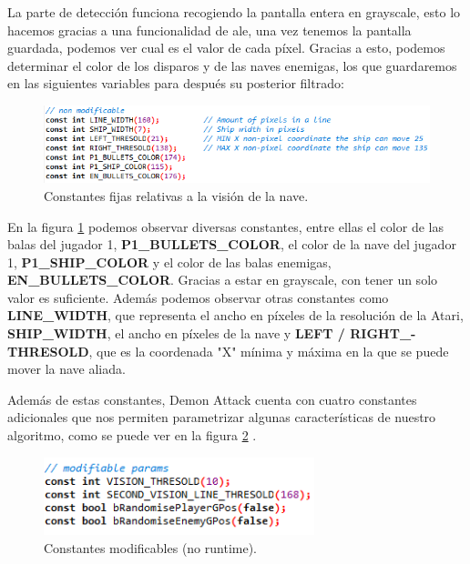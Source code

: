 La parte de detección funciona recogiendo la pantalla entera en grayscale, esto lo hacemos gracias a una funcionalidad de \ac{ale}, una vez tenemos la pantalla guardada, podemos ver cual es el valor de cada píxel. Gracias a esto, podemos determinar el color de los disparos y de las naves enemigas, los que guardaremos en las siguientes variables para después su posterior filtrado:

\begin{figure}[h]
	\centering
	\includegraphics[width=1\textwidth]{Figures/demonAttackStaticOne}
	\caption{Constantes fijas relativas a la visión de la nave.}
	\label{fig:demonAttackStaticOne}
\end{figure}

En la figura \ref{fig:demonAttackStaticOne} podemos observar diversas constantes, entre ellas el color de las balas del jugador 1, \textbf{P1\_BULLETS\_COLOR}, el color de la nave del jugador 1, \textbf{P1\_SHIP\_COLOR} y el color de las balas enemigas, \textbf{EN\_BULLETS\_COLOR}. Gracias a estar en grayscale, con tener un solo valor es suficiente. Además podemos observar otras constantes como \textbf{LINE\_WIDTH}, que representa el ancho en píxeles de la resolución de la Atari, \textbf{SHIP\_WIDTH}, el ancho en píxeles de la nave y \textbf{LEFT / RIGHT\_-THRESOLD}, que es la coordenada "X" mínima y máxima en la que se puede mover la nave aliada.

Además de estas constantes, Demon Attack cuenta con cuatro constantes adicionales que nos permiten parametrizar algunas características de nuestro algoritmo, como se puede ver en la figura \ref{fig:demonAttackChangableOne} .

\begin{figure}[h]
	\centering
	\includegraphics[width=0.7\textwidth]{Figures/demonAttackChangableOne}
	\caption{Constantes modificables (no runtime).}
	\label{fig:demonAttackChangableOne}
\end{figure}

